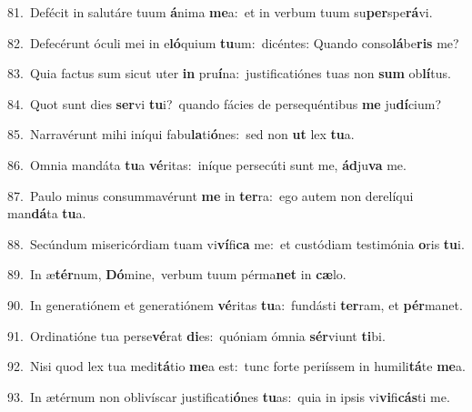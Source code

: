 {\numbfont\textcolor{\numbcolor}{81.}}~Defécit in salutáre tuum \textbf{á}\-nima \textbf{me}\-a:~\star et in verbum tuum su\-\textbf{per}\-spe\-\textbf{rá}\-vi.\par
{\numbfont\textcolor{\numbcolor}{82.}}~Defecérunt óculi mei in e\-\textbf{ló}\-quium \textbf{tu}\-um:~\star dicéntes: Quando conso\-\textbf{lá}\-be\textbf{ris} me?\par
{\numbfont\textcolor{\numbcolor}{83.}}~Quia factus sum sicut uter \textbf{in} pru\-\textbf{í}\-na:~\star justificatiónes tuas non \textbf{sum} ob\-\textbf{lí}\-tus.\par
{\numbfont\textcolor{\numbcolor}{84.}}~Quot sunt dies \textbf{ser}\-vi \textbf{tu}\-i?~\star quando fácies de persequéntibus \textbf{me} ju\-\textbf{dí}\-cium?\par
{\numbfont\textcolor{\numbcolor}{85.}}~Narravérunt mihi iníqui fabu\-\textbf{la}\-ti\-\textbf{ó}\-nes:~\star sed non \textbf{ut} lex \textbf{tu}\-a.\par
{\numbfont\textcolor{\numbcolor}{86.}}~Omnia mandáta \textbf{tu}\-a \textbf{vé}\-ritas:~\star iníque persecúti sunt me, \textbf{ád}\-ju\textbf{va} me.\par
{\numbfont\textcolor{\numbcolor}{87.}}~Paulo minus consummavérunt \textbf{me} in \textbf{ter}\-ra:~\star ego autem non derelíqui man\-\textbf{dá}\-ta \textbf{tu}\-a.\par
{\numbfont\textcolor{\numbcolor}{88.}}~Secúndum misericórdiam tuam vi\-\textbf{ví}\-fi\textbf{ca} me:~\star et custódiam testimónia \textbf{o}\-ris \textbf{tu}\-i.\par
{\numbfont\textcolor{\numbcolor}{89.}}~In æ\-\textbf{tér}\-num, \textbf{Dó}\-mine,~\star verbum tuum pérma\textbf{net} in \textbf{cæ}\-lo.\par
{\numbfont\textcolor{\numbcolor}{90.}}~In generatiónem et generatiónem \textbf{vé}\-ritas \textbf{tu}\-a:~\star fundásti \textbf{ter}\-ram, et \textbf{pér}\-manet.\par
{\numbfont\textcolor{\numbcolor}{91.}}~Ordinatióne tua perse\-\textbf{vé}\-rat \textbf{di}\-es:~\star quóniam ómnia \textbf{sér}\-viunt \textbf{ti}\-bi.\par
{\numbfont\textcolor{\numbcolor}{92.}}~Nisi quod lex tua medi\-\textbf{tá}\-tio \textbf{me}\-a est:~\star tunc forte periíssem in humili\-\textbf{tá}\-te \textbf{me}\-a.\par
{\numbfont\textcolor{\numbcolor}{93.}}~In ætérnum non oblivíscar justificati\-\textbf{ó}\-nes \textbf{tu}\-as:~\star quia in ipsis vi\-\textbf{vi}\-fi\-\textbf{cás}\-ti me.\par
